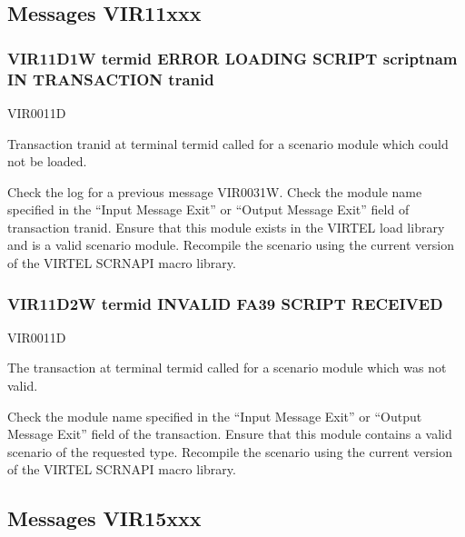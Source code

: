 \documentclass[letterpaper,10pt,english]{sphinxmanual}
\begin{document}
\subsection{Messages VIR11xxx}
\label{\detokenize{messages:messages-vir11xxx}}

\subsubsection{VIR11D1W termid ERROR LOADING SCRIPT scriptnam IN TRANSACTION tranid}
\label{\detokenize{messages:vir11d1w-termid-error-loading-script-scriptnam-in-transaction-tranid}}\begin{description}
\sphinxAtStartPar
VIR0011D

\sphinxAtStartPar
Transaction tranid at terminal termid called for a scenario module which could not be loaded.

\sphinxAtStartPar
Check the log for a previous message VIR0031W. Check the module name specified in the “Input Message Exit” or “Output Message Exit” field of transaction tranid. Ensure that this module exists in the VIRTEL load library and is a valid scenario module. Recompile the scenario using the current version of the VIRTEL SCRNAPI macro library.

\end{description}


\subsubsection{VIR11D2W termid INVALID FA39 SCRIPT RECEIVED}
\label{\detokenize{messages:vir11d2w-termid-invalid-fa39-script-received}}\begin{description}
\sphinxAtStartPar
VIR0011D

\sphinxAtStartPar
The transaction at terminal termid called for a scenario module which was not valid.

\sphinxAtStartPar
Check the module name specified in the “Input Message Exit” or “Output Message Exit” field of the transaction. Ensure that this module contains a valid scenario of the requested type. Recompile the scenario using the current version of the VIRTEL SCRNAPI macro library.

\end{description}


\subsection{Messages VIR15xxx}
\label{\detokenize{messages:messages-vir15xxx}}
\end{document}

